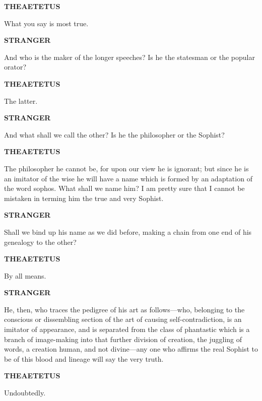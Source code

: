 \documentclass[11pt,letter]{article}
\begin{document}
\par \textbf{THEAETETUS}
\par   What you say is most true.

\par \textbf{STRANGER}
\par   And who is the maker of the longer speeches? Is he the statesman or the popular orator?

\par \textbf{THEAETETUS}
\par   The latter.

\par \textbf{STRANGER}
\par   And what shall we call the other? Is he the philosopher or the Sophist?

\par \textbf{THEAETETUS}
\par   The philosopher he cannot be, for upon our view he is ignorant; but since he is an imitator of the wise he will have a name which is formed by an adaptation of the word sophos. What shall we name him? I am pretty sure that I cannot be mistaken in terming him the true and very Sophist.

\par \textbf{STRANGER}
\par   Shall we bind up his name as we did before, making a chain from one end of his genealogy to the other?

\par \textbf{THEAETETUS}
\par   By all means.

\par \textbf{STRANGER}
\par   He, then, who traces the pedigree of his art as follows—who, belonging to the conscious or dissembling section of the art of causing self-contradiction, is an imitator of appearance, and is separated from the class of phantastic which is a branch of image-making into that further division of creation, the juggling of words, a creation human, and not divine—any one who affirms the real Sophist to be of this blood and lineage will say the very truth.

\par \textbf{THEAETETUS}
\par   Undoubtedly.

\par 
 
\end{document}
